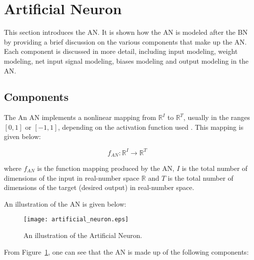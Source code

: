 \section{Artificial Neuron}
\label{sec:anns:an}

This section introduces the \ac{AN}. It is shown how the \ac{AN} is modeled
after the \ac{BN} by providing a brief discussion on the various components that
make up the \ac{AN}. Each component is discussed in more detail, including input
modeling, weight modeling, net input signal modeling,
biases modeling and output modeling in the \ac{AN}.

\subsection{Components}
\label{sec:anns:components}

The An \ac{AN} implements a nonlinear mapping from $\mathbb{R}^{I}$ to
$\mathbb{R}^{T}$, usually in the ranges $[0,1]$ or $[-1,1]$, depending on the
activation function used \cite{ref:engelbrecht:2007}. This mapping is given
below:

\begin{equation}
    f_{AN} \colon \mathbb{R}^{I} \to \mathbb{R}^{T}
    \label{eq:an_function_mapping}
\end{equation}

\noindent
where $f_{AN}$ is the function mapping produced by the \ac{AN}, $I$
is the total number of dimensions of the input in real-number space $\mathbb{R}$
and $T$ is the total number of dimensions of the target (desired output) in
real-number space.

An illustration of the \ac{AN} is given below:

\begin{figure}[H]
  \centering
  \texttt{[image: artificial\_neuron.eps]}
  \caption[The Artificial Neuron]{An illustration of
  the Artificial Neuron.}
  \label{fig:artificial_neuron}
\end{figure}

From Figure~\ref{fig:artificial_neuron}, one can see that the
\ac{AN} is made up of the following components:

